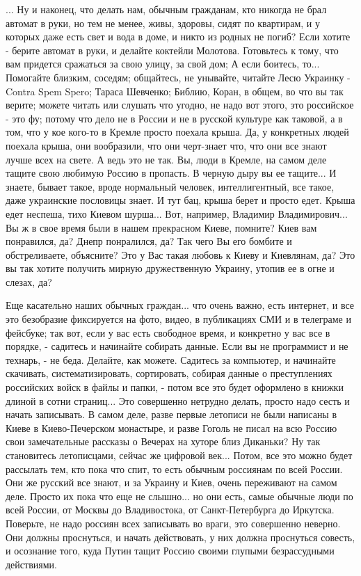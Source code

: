 ... Ну и наконец, что делать нам, обычным гражданам, кто никогда не брал
автомат в руки, но тем не менее, живы, здоровы, сидят по квартирам, и у которых
даже есть свет и вода в доме, и никто из родных не погиб? Если хотите - берите
автомат в руки, и делайте коктейли Молотова.  Готовьтесь к тому, что вам
придется сражаться за свою улицу, за свой дом; А если боитесь, то... Помогайте
близким, соседям; общайтесь, не унывайте, читайте Лесю Украинку - Contra Spem
Spero; Тараса Шевченко; Библию, Коран, в общем, во что вы так верите; можете
читать или слушать что угодно, не надо вот этого, это российское - это фу;
потому что дело не в России и не в русской культуре как таковой, а в том, что у
кое кого-то в Кремле просто поехала крыша. Да, у конкретных людей поехала
крыша, они вообразили, что они черт-знает что, что они все знают лучше всех на
свете.  А ведь это не так. Вы, люди в Кремле, на самом деле тащите свою любимую
Россию в пропасть. В черную дыру вы ее тащите... И знаете, бывает такое, вроде
нормальный человек, интеллигентный, все такое, даже украинские пословицы знает.
И тут бац, крыша берет и просто едет. Крыша едет неспеша, тихо Киевом шурша...
Вот, например, Владимир Владимирович... Вы ж в свое время были в нашем
прекрасном Киеве, помните? Киев вам понравился, да? Днепр понралился, да? Так
чего Вы его бомбите и обстреливаете, объясните? Это у Вас такая любовь к Киеву
и Киевлянам, да? Это вы так хотите получить мирную дружественную Украину,
утопив ее в огне и слезах, да?

Еще касательно наших обычных граждан... что очень важно, есть интернет, и все
это безобразие фиксируется на фото, видео, в публикациях СМИ и в телеграме и
фейсбуке; так вот, если у вас есть свободное время, и конкретно у вас все в
порядке, - садитесь и начинайте собирать данные. Если вы не программист и не
технарь, - не беда.  Делайте, как можете. Садитесь за компьютер, и начинайте
скачивать, систематизировать, сортировать, собирая данные о преступлениях
российских войск в файлы и папки, - потом все это будет оформлено в книжки
длиной в сотни страниц...  Это совершенно нетрудно делать, просто надо сесть и
начать записывать. В самом деле, разве первые летописи не были написаны в Киеве
в Киево-Печерском монастыре, и разве Гоголь не писал на всю Россию свои
замечательные рассказы о Вечерах на хуторе близ Диканьки?  Ну так становитесь
летописцами, сейчас же цифровой век...  Потом, все это можно будет рассылать
тем, кто пока что спит, то есть обычным россиянам по всей России. Они же
русский все знают, и за Украину и Киев, очень переживают на самом деле. Просто
их пока что еще не слышно... но они есть, самые обычные люди по всей России, от
Москвы до Владивостока, от Санкт-Петербурга до Иркутска. Поверьте, не надо
россиян всех записывать во враги, это совершенно неверно. Они должны
проснуться, и начать действовать, у них должна проснуться совесть, и осознание
того, куда Путин тащит Россию своими глупыми безрассудными действиями. 


